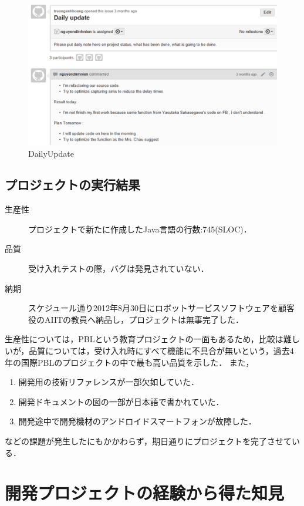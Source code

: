 \documentclass[a4j, 12Q, twocolumn, twoside]{jsarticle}
\begin{document}
\begin{figure}
  \begin{center}
    \includegraphics[width=\columnwidth]{./figures/DailyUPDate.png}
    \caption{DailyUpdate}
    \label{fig:dailyupdate}
  \end{center}
\end{figure}

\subsection{プロジェクトの実行結果}
\begin{description}
 \item[生産性] プロジェクトで新たに作成したJava言語の行数:745(SLOC)．
 \item[品質] 受け入れテストの際，バグは発見されていない．
 \item[納期]スケジュール通り2012年8月30日にロボットサービスソフトウェアを顧客役のAIITの教員へ納品し，プロジェクトは無事完了した．
\end{description}
生産性については，PBLという教育プロジェクトの一面もあるため，比較は難しいが，品質については，受け入れ時にすべて機能に不具合が無いという，過去4年の国際PBLのプロジェクトの中で最も高い品質を示した．
また，
\begin{enumerate}
 \item 開発用の技術リファレンスが一部欠如していた．
 \item 開発ドキュメントの図の一部が日本語で書かれていた．
 \item 開発途中で開発機材のアンドロイドスマートフォンが故障した．
\end{enumerate}
などの課題が発生したにもかかわらず，期日通りにプロジェクトを完了させている．

\section{開発プロジェクトの経験から得た知見}\label{sec:lessonslearned}
\end{document}
